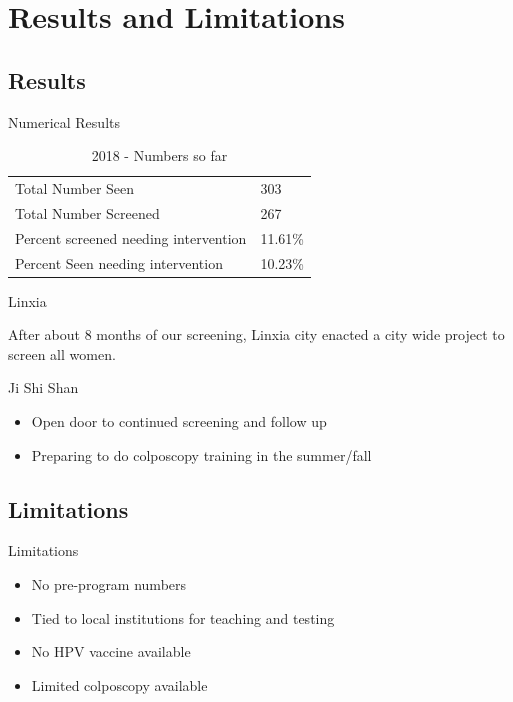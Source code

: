 \section{Results and Limitations}\label{results-and-limitations}

\subsection{Results}\label{results}

\begin{frame}{Numerical Results}

\begin{table}
\begin{tabular}{l | l}
Total Number Seen & 303\\
Total Number Screened & 267\\
Percent screened needing intervention & 11.61\% \\
Percent Seen needing intervention & 10.23\% \\
\end{tabular}
\caption{2018 - Numbers so far}
\end{table}

\end{frame}

\begin{frame}{Linxia}

After about 8 months of our screening, Linxia city enacted a city wide
project to screen all women.

\end{frame}

\begin{frame}{Ji Shi Shan}

\begin{itemize}
\itemsep1pt\parskip0pt
\item
  Open door to continued screening and follow up
\item
  Preparing to do colposcopy training in the summer/fall
\end{itemize}

\end{frame}

\subsection{Limitations}\label{limitations}

\begin{frame}{Limitations}

\begin{itemize}
\itemsep1pt\parskip0pt
\item
  No pre-program numbers
\item
  Tied to local institutions for teaching and testing
\item
  No HPV vaccine available
\item
  Limited colposcopy available
\end{itemize}

\end{frame}

